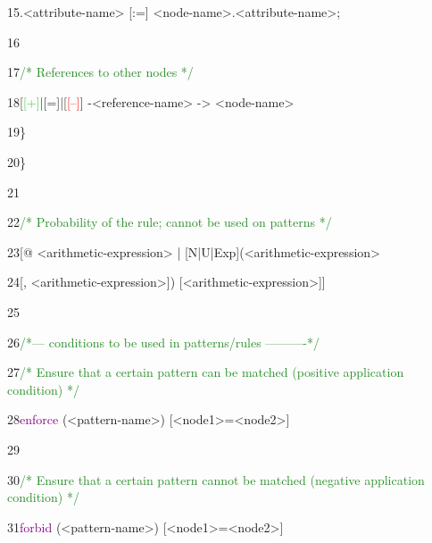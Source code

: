 {15\hspace{1.5cm}.<attribute-name> [:=] <node-name>.<attribute-name>;

16

17\hspace{1.5cm}\textcolor{ForestGreen}{/* References to other nodes */}

18\hspace{1.5cm}[\textcolor{LimeGreen}{[+]}|[=]|[\textcolor{Red}{[--]}] -<reference-name> -> <node-name>

19\hspace{1cm}\}

20\hspace{0.5cm}\}

21




22\hspace{0.5cm}\textcolor{ForestGreen}{/* Probability of the rule; cannot be used on patterns */}

23\hspace{0.5cm}[@ <arithmetic-expression> | [N|U|Exp](<arithmetic-expression>

24\hspace{0.5cm}[, <arithmetic-expression>]) [<arithmetic-expression>]]

25

26\hspace{0.5cm}\textcolor{ForestGreen}{/*--- conditions to be used in patterns/rules ----------*/}

27\hspace{0.5cm}\textcolor{ForestGreen}{/* Ensure that a certain pattern can be matched (positive application condition) */}

28\hspace{0.5cm}\textcolor{Purple}{enforce} (<pattern-name>) [<node1>=<node2>]

29

30\hspace{0.5cm}\textcolor{ForestGreen}{/* Ensure that a certain pattern cannot be matched (negative application condition) */}

31\hspace{0.5cm}\textcolor{Purple}{forbid} (<pattern-name>) [<node1>=<node2>]

}
